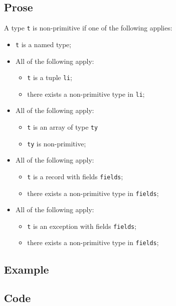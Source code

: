 \documentclass{book}
\begin{document}
    \subsection{Prose} 
    A type \texttt{t} is non-primitive if one of the following applies:
    \begin{itemize}
    \item \texttt{t} is a named type;
    \item All of the following apply:
      \begin{itemize}
      \item \texttt{t} is a tuple \texttt{li};
      \item there exists a non-primitive type in \texttt{li};
      \end{itemize}
    \item All of the following apply:
      \begin{itemize}
      \item \texttt{t} is an array of type \texttt{ty}
      \item \texttt{ty} is non-primitive; 
      \end{itemize}
    \item All of the following apply:
      \begin{itemize}
      \item \texttt{t} is a record with fields \texttt{fields};
      \item there exists a non-primitive type in \texttt{fields};
      \end{itemize}
    \item All of the following apply:
      \begin{itemize}
      \item \texttt{t} is an exception with fields \texttt{fields};
      \item there exists a non-primitive type in \texttt{fields};
      \end{itemize}
    \end{itemize}

    \subsection{Example}

    \subsection{Code}
\end{document}
